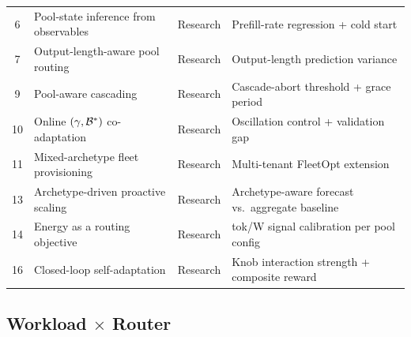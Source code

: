 \begin{table}[t]
\begin{tabularx}{\textwidth}{c l c X}
\rowcolor{poolorange!8}
6  & Pool-state inference from observables  & Research & Prefill-rate regression + cold start \\
7  & Output-length-aware pool routing       & Research & Output-length prediction variance \\
\rowcolor{poolorange!8}
9  & Pool-aware cascading                   & Research & Cascade-abort threshold + grace period \\
10 & Online $(\gamma, \mathcal{B}^*)$ co-adaptation & Research & Oscillation control + validation gap \\
\rowcolor{poolorange!8}
11 & Mixed-archetype fleet provisioning     & Research & Multi-tenant FleetOpt extension \\
13 & Archetype-driven proactive scaling     & Research & Archetype-aware forecast vs.\ aggregate baseline \\
\rowcolor{poolorange!8}
14 & Energy as a routing objective          & Research & tok/W signal calibration per pool config \\
16 & Closed-loop self-adaptation            & Research & Knob interaction strength + composite reward \\
\bottomrule
\end{tabularx}
\end{table}


\subsection{Workload $\times$ Router}

